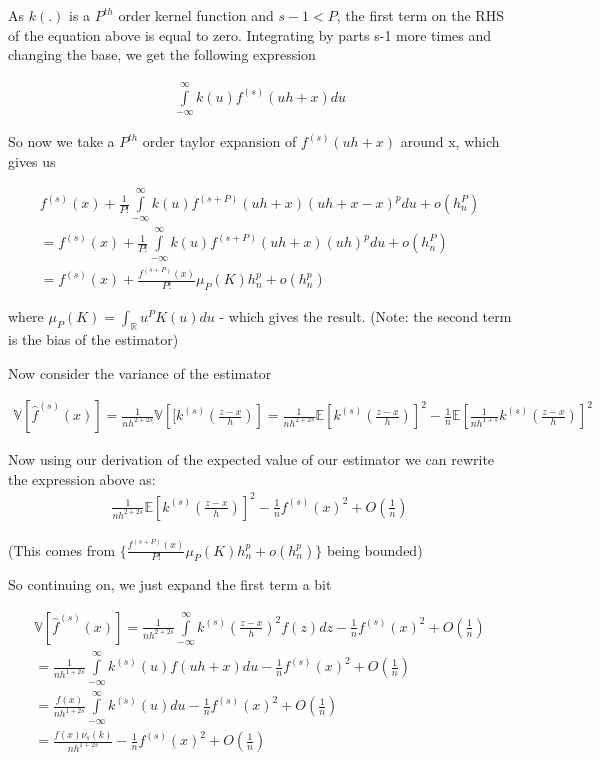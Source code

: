 \documentclass[12pt]{article}
\newcommand{\R}{\mathbb{R}}
\newcommand{\E}{\mathbb{E}}
\newcommand{\V}{\mathbb{V}}
\newcommand{\vpar}{\vspace{.3cm}}
\begin{document}
As $k(.)$ is a $P^{th}$ order kernel function and $s-1<P$, the first term on the RHS of the equation above is equal to zero. Integrating by parts s-1 more times and changing the base, we get the following expression

\begin{gather*}
\int\limits_{-\infty}^{\infty} k \left( u \right) f^{(s)}(uh+x) du
\end{gather*}


So now we take a $P^{th}$ order taylor expansion of $f^{(s)}(uh+x)$ around x, which gives us


\begin{gather*}
f^{(s)}(x) + \frac{1}{P!}\int\limits_{-\infty}^{\infty} k \left( u \right) f^{(s+P)}(uh+x) (uh + x - x)^p du + o(h_n^P)\\
= f^{(s)}(x) + \frac{1}{P!}\int\limits_{-\infty}^{\infty} k \left( u \right) f^{(s+P)}(uh+x) (uh)^p du + o(h_n^P) \\
= f^{(s)}(x) + \frac{f^{(s+P)}(x)}{P!} \mu_P(K) h_n^p +o(h_n^p)
\end{gather*}

where $ \mu_P(K) = \int_\R u^P K(u) du $ - which gives the result. (Note: the second term is the bias of the estimator)

\vpar

Now consider the variance of the estimator

\begin{gather*}
  \V[\hat{f}^{(s)}(x)] = \frac{1}{nh^{2+2s}} \V\left[[k^{(s)} \left( \frac{z-x}{h} \right)\right] = \frac{1}{nh^{2+2s}} \E\left[k^{(s)} \left( \frac{z-x}{h} \right)\right]^2 - \frac{1}{n} \E\left[\frac{1}{nh^{1+s}} k^{(s)} \left( \frac{z-x}{h} \right)\right]^2
\end{gather*}

Now using our derivation of the expected value of our estimator we can rewrite the expression above as:
\begin{gather*}
\frac{1}{nh^{2+2s}} \E\left[k^{(s)} \left( \frac{z-x}{h} \right)\right]^2 - \frac{1}{n}f^{(s)}(x)^2 + O\left(\frac{1}{n}\right)
\end{gather*}

(This comes from $\{ \frac{f^{(s+P)}(x)}{P!} \mu_P(K) h_n^p +o(h_n^p)\}$ being bounded)

So continuing on, we just expand the first term a bit

\begin{gather*}
\V[\hat{f}^{(s)}(x)] = \frac{1}{nh^{2+2s}} \int\limits_{-\infty}^{\infty} k^{(s)} \left( \frac{z-x}{h} \right)^2 f(z) dz - \frac{1}{n}f^{(s)}(x)^2 + O\left(\frac{1}{n}\right) \\
 = \frac{1}{nh^{1+2s}}  \int\limits_{-\infty}^{\infty} k^{(s)} \left( u \right) f(uh+x) du  - \frac{1}{n}f^{(s)}(x)^2 + O\left(\frac{1}{n}\right)  \\
 = \frac{f(x)}{nh^{1+2s}}  \int\limits_{-\infty}^{\infty} k^{(s)} \left( u \right) du  - \frac{1}{n}f^{(s)}(x)^2 + O\left(\frac{1}{n}\right)  \\
  = \frac{f(x) \nu_s(k) }{nh^{1+2s}}- \frac{1}{n}f^{(s)}(x)^2 + O\left(\frac{1}{n}\right)  \\
\end{gather*}
\end{document}
